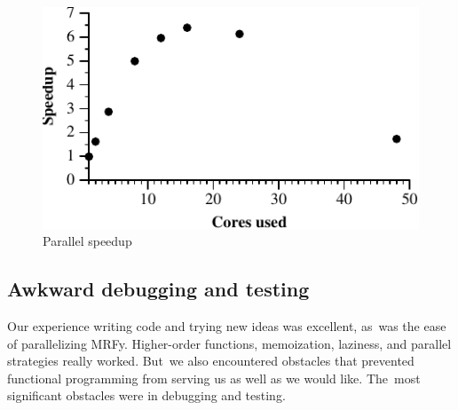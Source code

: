 \documentclass[preprint,nonatbib,blockstyle,times]{sigplanconf}
\newcommand\mrfy{MRFy} %
\newcommand\seclabel[1]{\label{sec:#1}}
\begin{document}


\begin{figure}%
\centerline{\includegraphics{speedup}}
\medskip
\caption{Parallel speedup}
\label{fig:speedup}
\end{figure}

%





\subsection{Awkward debugging and testing}

\seclabel{awkward-profiling}

Our experience writing code and trying new ideas was excellent, as~was
the ease of parallelizing \mrfy.
Higher-order functions, memoization, laziness, and parallel strategies
really worked.
But~we also encountered obstacles that prevented functional
programming from serving us as well as we would like.
The~most significant obstacles were in debugging and testing.
\end{document}
